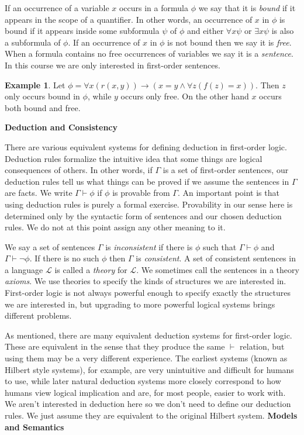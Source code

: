 \documentclass{article}
\theoremstyle{plain}
\theoremstyle{definition}
\newtheorem{example}[theorem]{Example}{\bfseries}{\upshape}
\newcommand{\ra}{\rightarrow}
\begin{document}
If an occurrence of a variable $x$ occurs in a formula $\phi$ we say that it is \emph{bound} if it appears in the scope of a quantifier. In other words, an occurrence of $x$ in $\phi$ is bound if it appears inside some subformula $\psi$ of $\phi$ and either $\forall x \psi$ or $\exists x \psi$ is also a subformula of $\phi$. If an occurrence of $x$ in $\phi$ is not bound then we say it is \emph{free}. When a formula contains no free occurrences of variables we say it is a \emph{sentence}. In this course we are only interested in first-order sentences. 

\begin{example}
Let $\phi=\forall x (r(x,y))\ra (x=y\wedge \forall z(f(z)=x))$. Then $z$ only occurs bound in $\phi$, while $y$ occurs only free. On the other hand $x$ occurs both bound and free.
\end{example}
\noindent
\textbf{Deduction and Consistency} 

There are various equivalent systems for defining deduction in first-order logic. Deduction rules formalize the intuitive idea that some things are logical consequences of others. In other words, if $\Gamma$ is a set of first-order sentences, our deduction rules tell us what things can be proved if we assume the sentences in $\Gamma$ are facts. We write $\Gamma\vdash \phi$ if $\phi$ is provable from $\Gamma$. An important point is that using deduction rules is purely a formal exercise. Provability in our sense here is determined only by the syntactic form of sentences and our chosen deduction rules. We do not at this point assign any other meaning to it. 

We say a set of sentences $\Gamma$ is \emph{inconsistent} if there is $\phi$ such that $\Gamma\vdash \phi$ and $\Gamma\vdash \neg \phi$. If there is no such $\phi$ then $\Gamma$ is \emph{consistent}. A set of consistent sentences in a language $\mathscr{L}$ is called a \emph{theory} for $\mathscr{L}$. We sometimes call the sentences in a theory \emph{axioms}. We use theories to specify the kinds of structures we are interested in. First-order logic is not always powerful enough to specify exactly the structures we are interested in, but upgrading to more powerful logical systems brings different problems. 

As mentioned, there are many equivalent deduction systems for first-order logic. These are equivalent in the sense that they produce the same $\vdash$ relation, but using them may be a very different experience. The earliest systems (known as Hilbert style systems), for example, are very unintuitive and difficult for humans to use, while later natural deduction systems more closely correspond to how humans view logical implication and are, for most people, easier to work with. We aren't interested in deduction here so we don't need to define our deduction rules. We just assume they are equivalent to the original Hilbert system.      
\newline
\newline
\textbf{Models and Semantics} 
\end{document}
